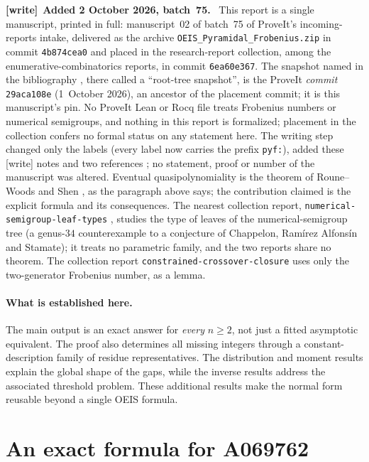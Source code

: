 \documentclass[11pt,a4paper]{article}
\numberwithin{equation}{section}
\theoremstyle{definition}
\newenvironment{writenote}[1][]{\par\smallskip\begingroup\small
 \noindent\textbf{[write]}\if\relax\detokenize{#1}\relax\else~\textbf{#1.}\fi\ }%
 {\par\endgroup\smallskip}
\begin{document}
\begin{writenote}[Added 2 October 2026, batch~75]
This report is a single manuscript, printed in full: manuscript~02 of
batch~75 of ProveIt's incoming-reports intake, delivered as the archive
\texttt{OEIS\_\allowbreak Pyramidal\_\allowbreak Frobenius.zip} in commit
\texttt{4b874cea0} and placed in the research-report collection, among the
enumerative-combinatorics reports, in commit \texttt{6ea60e367}. The
snapshot named in the bibliography \cite{proveit}, there called a
``root-tree snapshot'', is the ProveIt \emph{commit} \texttt{29aca108e}
(1~October 2026), an ancestor of the placement commit; it is this
manuscript's pin. No ProveIt Lean or Rocq file treats Frobenius numbers or
numerical semigroups, and nothing in this report is formalized; placement
in the collection confers no formal status on any statement here. The
writing step changed only the labels (every label now carries the prefix
\texttt{pyf:}), added these \textsf{[write]} notes and two references
\cite{pyf-tai,pyf-leaf}; no statement, proof or number of the manuscript
was altered. Eventual quasipolynomiality is the theorem of Roune--Woods and
Shen \cite{rw,shen}, as the paragraph above says; the contribution claimed
is the explicit formula and its consequences. The nearest collection report,
\texttt{numerical-\allowbreak semigroup-\allowbreak leaf-\allowbreak types}
\cite{pyf-leaf}, studies the type of leaves of the numerical-semigroup tree
(a genus-$34$ counterexample to a conjecture of Chappelon, Ram\'irez
Alfons\'in and Stamate); it treats no parametric family, and the two reports
share no theorem. The collection report
\texttt{constrained-\allowbreak crossover-\allowbreak closure} uses only the
two-generator Frobenius number, as a lemma.
\end{writenote}

\paragraph{What is established here.}
The main output is an exact answer for \emph{every} $n\geq2$, not just a fitted
asymptotic equivalent. The proof also determines all missing integers through
a constant-description family of residue representatives. The distribution
and moment results explain the global shape of the gaps, while the inverse
results address the associated threshold problem. These additional results
make the normal form reusable beyond a single OEIS formula.

\section{An exact formula for A069762}\label{pyf:sec:main}
\end{document}
